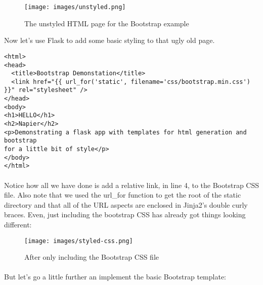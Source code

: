 \documentclass[12pt, a4paper, twoside]{book}
\begin{document}
\begin{figure}[H]
\centering
\texttt{[image: images/unstyled.png]}
\caption{The unstyled HTML page for the Bootstrap example}
\label{fig:unstyled}
\end{figure}

Now let's use Flask to add some basic styling to that ugly old page.

\begin{lstlisting}
<html>
<head>
  <title>Bootstrap Demonstation</title>
  <link href="{{ url_for('static', filename='css/bootstrap.min.css') }}" rel="stylesheet" />
</head>
<body>
<h1>HELLO</h1>
<h2>Napier</h2>
<p>Demonstrating a flask app with templates for html generation and bootstrap
for a little bit of style</p>
</body>
</html>
\end{lstlisting}

\paragraph{} Notice how all we have done is add a relative link, in line 4, to the Bootstrap CSS file. Also note that we used the url\_for function to get the root of the static directory and that all of the URL aspects are enclosed in Jinja2's double curly braces.  Even, just including the bootstrap CSS has already got things looking different:

\begin{figure}[H]
\centering
\texttt{[image: images/styled-css.png]}
\caption{After only including the Bootstrap CSS file}
\label{fig:styled-css}
\end{figure}

\paragraph{} But let's go a little further an implement the basic Bootstrap template:
\end{document}
